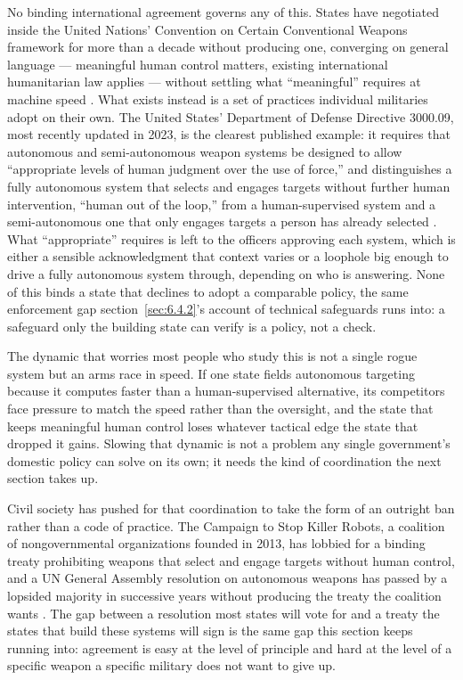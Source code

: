 No binding international agreement governs any of this. States have negotiated inside the United Nations' Convention on Certain Conventional Weapons framework for more than a decade without producing one, converging on general language — meaningful human control matters, existing international humanitarian law applies — without settling what “meaningful” requires at machine speed \autocite{ccwgge2026chairsummary}. What exists instead is a set of practices individual militaries adopt on their own. The United States' Department of Defense Directive 3000.09, most recently updated in 2023, is the clearest published example: it requires that autonomous and semi-autonomous weapon systems be designed to allow “appropriate levels of human judgment over the use of force,” and distinguishes a fully autonomous system that selects and engages targets without further human intervention, “human out of the loop,” from a human-supervised system and a semi-autonomous one that only engages targets a person has already selected \autocite{dod2023autonomy}. What “appropriate” requires is left to the officers approving each system, which is either a sensible acknowledgment that context varies or a loophole big enough to drive a fully autonomous system through, depending on who is answering. None of this binds a state that declines to adopt a comparable policy, the same enforcement gap section~\ref{sec:6.4.2}'s account of technical safeguards runs into: a safeguard only the building state can verify is a policy, not a check.

The dynamic that worries most people who study this is not a single rogue system but an arms race in speed. If one state fields autonomous targeting because it computes faster than a human-supervised alternative, its competitors face pressure to match the speed rather than the oversight, and the state that keeps meaningful human control loses whatever tactical edge the state that dropped it gains. Slowing that dynamic is not a problem any single government's domestic policy can solve on its own; it needs the kind of coordination the next section takes up.

Civil society has pushed for that coordination to take the form of an outright ban rather than a code of practice. The Campaign to Stop Killer Robots, a coalition of nongovernmental organizations founded in 2013, has lobbied for a binding treaty prohibiting weapons that select and engage targets without human control, and a UN General Assembly resolution on autonomous weapons has passed by a lopsided majority in successive years without producing the treaty the coalition wants \autocite{unga2023laws}. The gap between a resolution most states will vote for and a treaty the states that build these systems will sign is the same gap this section keeps running into: agreement is easy at the level of principle and hard at the level of a specific weapon a specific military does not want to give up.

